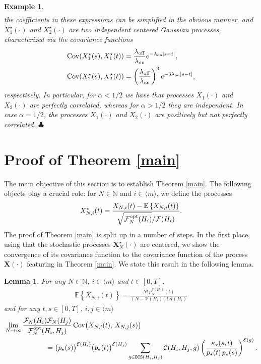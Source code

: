 \documentclass[11pt,reqno]{amsart}
\numberwithin{equation}{section}
\newcommand{\abs}[1]{\left\lvert #1 \right\rvert}
\newcommand{\sprod}[1]{\langle#1\rangle}
\newcommand{\E}[1]{\mathbb{E}\left\{ #1\right\}}
\newcommand{\N}{\mathbb{N}}
\newtheorem{lem}[theo]{Lemma}
\newtheorem{example}[theo]{Example}
\newcommand{\netheo}[1]{{Theorem \ref{#1}}}
\newcommand{\kb}[1]{\boldsymbol{#1}}
\newcommand{\vk}[1]{\kb{#1}}
\begin{document}
{\begin{example}
\begin{align*}
\end{align*}
the coefficients in these expressions can be simplified in the obvious manner, and $X_1^{\star}(\cdot)$ and $X_2^{\star}(\cdot)$ are two independent centered Gaussian processes, characterized via the covariance functions
\begin{align*}
    \operatorname{Cov}(X_1^{\star}(s),X_{1}^{\star}(t)) &= \frac{\lambda_{\rm off}}{\lambda_{\rm on}}e^{-\lambda_{\rm on}\abs{s-t}},\\
    \operatorname{Cov}(X_2^{\star}(s),X_{2}^{\star}(t)) &= \left(\frac{\lambda_{\rm off}}{\lambda_{\rm on}}\right)^{3}e^{-3\lambda_{\rm on}\abs{s-t}},
\end{align*}
respectively.
In particular, for $\alpha<1/2$ we have that processes {$X_1(\cdot)$} and {$X_2(\cdot)$} are perfectly correlated, whereas for $\alpha>1/2$ they are independent. {In case $\alpha=1/2$, the processes {$X_1(\cdot)$} and {$X_2(\cdot)$} are positively but not perfectly correlated.} \hfill$\clubsuit$
\end{example}

}


\section{Proof of \netheo{main}}\label{section:proof_of_main}
The main objective of this section is to establish \netheo{main}. The following objects play a crucial role: for $N\in\N$ and $i\in\sprod{m}$, we define the processes
\begin{align}
    X^{\star}_{N,i}(t) = \frac{X_{N,i}(t) - \E{X_{N,i}(t)}}{\sqrt{\mathcal{F}^{\rm opt}_N({H}_i)}/\mathcal{F}({H}_i)}.\label{X_star_def}
\end{align}
The proof of \netheo{main} is split up in a number of steps. In the first place, using that the stochastic processes {$\vk X_N^{\star}(\cdot)$} are centered, we show the convergence of its covariance function to the covariance function of the process {$\vk X(\cdot)$} featuring in \netheo{main}. We state this result in the following lemma.  

\begin{lem}\label{lem:exp_and_cov}
    For any $N\in\N$, $i\in\sprod{m}$ and $t\in[0,T]$,
    \begin{align}
        \E{X_{N,i}(t)} = \frac{N!\,p_N^{\mathcal{E}({H}_i)}(t)}{(N-\mathcal{V}({H}_i))!\mathcal{A}({H}_i)}\label{E_formula}
    \end{align}
    and for any $t,s\in[0,T]$, $i,j\in\sprod{m}$ 
    \begin{align}
        &\lim_{N\to\infty}\frac{\mathcal{F}_N({H}_i)\mathcal{F}_N({H}_j)}{\mathcal{F}_N^{\rm opt}({H}_i,{H}_j)}\operatorname{Cov}\bigl(X_{N,i}(t),\,X_{N,j}(s)\bigr) \notag\\
        &\qquad\qquad\qquad= \bigl(p_{\star}(s)\bigr)^{\mathcal{E}({H}_i)}\bigl(p_{\star}(t)\bigr)^{\mathcal{E}({H}_j)} \sum_{g\in{\tt OCS}({H}_i,{H}_j)}\mathcal{C}({H}_i,{H}_j,g)\left(\frac{\kappa_{\star}(s,t)}{p_{\star}(t)\,p_{\star}(s)}\right)^{\mathcal{E}(g)}.\label{Cov_formula}
    \end{align}
\end{lem}
\end{document}
